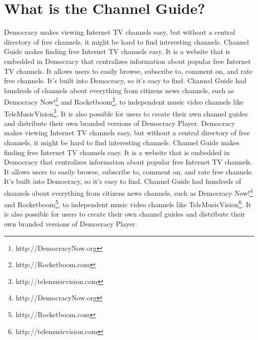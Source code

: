 \documentclass[a4paper,12pt]{report}
\begin{document}
\section {What is the Channel Guide?}
Democracy makes viewing Internet TV channels easy, but without a central directory of free channels, it might be hard to find interesting channels.
Channel Guide makes finding free Internet TV channels easy.
It is a website that is embedded in Democracy that centralizes information about popular free Internet TV channels.
It allows users to easily browse, subscribe to, comment on, and rate free channels.
It's built into Democracy, so it's easy to find.
Channel Guide had hundreds of channels about everything from citizens news channels, such as Democracy Now!\footnote { http://DemocracyNow.org} and Rocketboom\footnote {http://Rocketboom.com}, to independent music video channels like TeleMusicVision\footnote{ http://telemusicvision.com}.
It is also possible for users to create their own channel guides and distribute their own branded versions of Democracy Player.
Democracy makes viewing Internet TV channels easy, but without a central directory of free channels, it might be hard to find interesting channels. 
Channel Guide makes finding free Internet TV channels easy. 
It is a website that is embedded in Democracy that centralizes information about popular free Internet TV channels. 
It allows users to easily browse, subscribe to, comment on, and rate free channels. 
It's built into Democracy, so it's easy to find. 
Channel Guide had hundreds of channels about everything from citizens news channels, such as Democracy Now!\footnote {http://DemocracyNow.org} and Rocketboom\footnote {http://Rocketboom.com}, to independent music video channels like TeleMusicVision\footnote{http://telemusicvision.com}. 
It is also possible for users to create their own channel guides and distribute their own branded versions of Democracy Player. 
\end{document}

